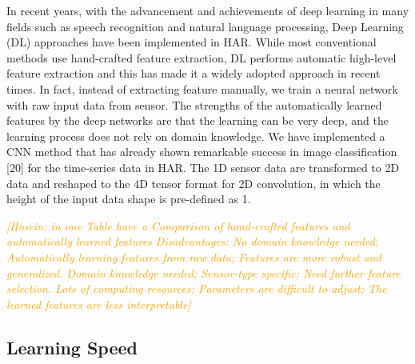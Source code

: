 \documentclass[journal,article,submit,moreauthors,pdftex]{Definitions/mdpi}
\newcommand{\hosein}[1]{\textcolor{orange}{{\it [Hosein: #1]}}}
\begin{document}
In recent years, with the advancement and achievements of deep learning in many fields such as speech recognition and natural language processing, Deep Learning (DL) approaches have been implemented in HAR. 
While most conventional methods use hand-crafted feature extraction, DL performs automatic high-level feature extraction and this has made it a widely adopted approach in recent times. In fact, instead of extracting feature manually, we train a neural network with raw input data from sensor. The strengths of the automatically learned features by the deep networks are that the learning can be very deep, and the learning process does not rely on domain knowledge.
We have implemented a CNN method that has already shown remarkable success in image classification [20] for the time-series data in HAR. The 1D sensor data are transformed to 2D data and reshaped to the 4D tensor format for 2D convolution, in which the height of the input data shape is pre-defined as 1.


\hosein{ in one Table have a Comparison of hand-crafted features and automatically learned features Disadvantages: 
	No domain knowledge needed; Automatically learning features from raw data; Features are more robust and generalized.
	Domain knowledge needed; Sensor-type specific; Need further feature selection.
Lots of computing resources; Parameters are difficult to adjust; The learned features are less interpretable}


\subsection{Learning Speed }
\end{document}
